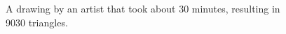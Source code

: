 \documentclass[review]{acmsiggraph}
\begin{document}






\begin{figure}
    \centering
    \caption{A drawing by an artist that took about 30 minutes, resulting in 9030 triangles.} %
    \label{fig:face}
\end{figure}
\end{document}
